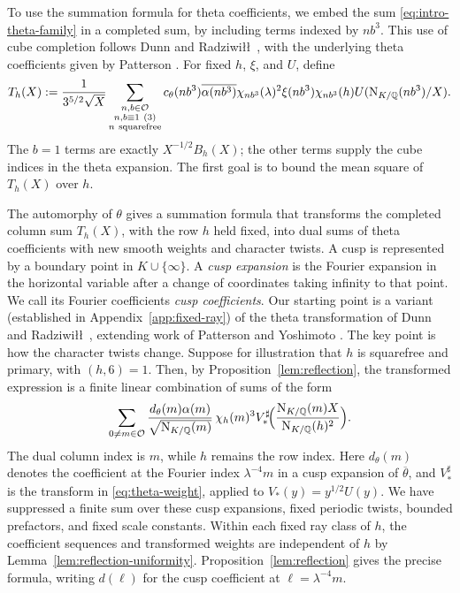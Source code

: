 \documentclass[11pt,a4paper]{article}
\numberwithin{equation}{section}
\numberwithin{figure}{section}
\theoremstyle{definition}
\theoremstyle{remark}
\newcommand{\Q}{\mathbb Q}
\newcommand{\NK}{\mathrm N_{K/\Q}}
\newcommand{\OO}{\mathcal O}
\begin{document}
To use the summation formula for theta coefficients, we embed the sum \eqref{eq:intro-theta-family} in a completed sum, by including terms indexed by $nb^3$. This use of cube completion follows Dunn and Radziwi\l\l\ \cite[Lemma~5.4 and Proposition~5.3]{DR}, with the underlying theta coefficients given by Patterson \cite[Theorem~8.1]{Pat77}. For fixed $h$, $\xi$, and $U$, define
\begin{equation}\label{eq:intro-completed-theta-sum}
T_h(X):=\frac{1}{3^{5/2}\sqrt X}
 \sum_{\substack{n,b\in\OO\\n,b\equiv1\ (3)\\n\ {\rm squarefree}}}
 c_\theta(nb^3)\overline{\alpha(nb^3)}\chi_{nb^3}(\lambda)^2
 \xi(nb^3)\chi_{nb^3}(h)U(\NK(nb^3)/X).
\end{equation}
The $b=1$ terms are exactly $X^{-1/2}B_h(X)$; the other
terms supply the cube indices in the theta expansion. The first goal is to bound the mean square of $T_h(X)$ over $h$.

The automorphy of $\theta$ gives a summation formula that transforms the completed column sum $T_h(X)$, with the row $h$ held fixed, into dual sums of theta coefficients with new smooth weights and character twists.
A cusp is represented by a boundary point in $K\cup\{\infty\}$. A \emph{cusp expansion} is the Fourier expansion in the horizontal variable after a change of coordinates taking infinity to that point. We call its Fourier coefficients \emph{cusp coefficients}.
Our starting point is a variant (established in Appendix~\ref{app:fixed-ray}) of the theta transformation of Dunn and Radziwi\l\l\ \cite[\S5]{DR}, extending work of Patterson \cite{Pat77} and Yoshimoto \cite{Yos87}. The key point is how the character twists change. Suppose for
illustration that $h$ is squarefree and primary, with $(h,6)=1$. Then, by Proposition~\ref{lem:reflection}, the transformed expression is a finite linear combination of sums of the form
\begin{equation}\label{eq:intro-dual-theta-sum}
 \sum_{0\ne m\in\OO}
 \frac{d_\theta(m)\alpha(m)}{\sqrt{\NK(m)}}\,
 \chi_h(m)^3
 V_*^\sharp\!\Bigl(\frac{\NK(m)X}{\NK(h)^2}\Bigr).
\end{equation}
The dual column index is $m$, while $h$ remains the row index.
Here $d_\theta(m)$ denotes the coefficient at the Fourier index
$\lambda^{-4}m$ in a cusp expansion of $\overline\theta$, and
$V_*^\sharp$ is the transform in \eqref{eq:theta-weight}, applied to $V_*(y)=y^{1/2}U(y)$.
We have suppressed
a finite sum over these cusp expansions, fixed periodic twists,
bounded prefactors, and fixed scale constants. Within each fixed
ray class of $h$, the coefficient sequences and transformed weights
are independent of $h$ by Lemma~\ref{lem:reflection-uniformity}.
Proposition~\ref{lem:reflection} gives the
precise formula, writing $d(\ell)$ for the cusp coefficient at
$\ell=\lambda^{-4}m$.
\end{document}
